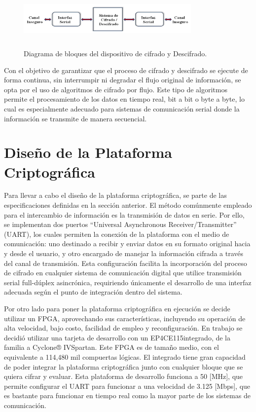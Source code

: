 \clearpage

\begin{figure}[h!] %
    \centering %
     \includegraphics[width=0.8\textwidth, height=3cm]{imagenes/img5} %
    \caption{Diagrama de bloques del dispositivo de cifrado y Descifrado.}
    \label{fig:imagen5} %
\end{figure} 

Con el objetivo de garantizar que el proceso de cifrado y descifrado se ejecute de forma continua, sin interrumpir ni degradar el flujo original de información, se opta por el uso de algoritmos de cifrado por flujo. Este tipo de algoritmos permite el procesamiento de los datos en tiempo real, bit a bit o byte a byte, lo cual es especialmente adecuado para sistemas de comunicación serial donde la información se transmite de manera secuencial.

\section{Diseño de la Plataforma Criptográfica}

Para llevar a cabo el diseño de la plataforma criptográfica, se parte de las especificaciones definidas en la sección anterior. El método comúnmente empleado para el intercambio de información es la transmisión de datos en serie. Por ello, se implementan dos puertos “Universal Asynchronous Receiver/Transmitter” (UART), los cuales permiten la conexión de la plataforma con el medio de comunicación: uno destinado a recibir y enviar datos en su formato original hacia y desde el usuario, y otro encargado de manejar la información cifrada a través del canal de transmisión. Esta configuración facilita la incorporación del proceso de cifrado en cualquier sistema de comunicación digital que utilice transmisión serial full-dúplex asincrónica, requiriendo únicamente el desarrollo de una interfaz adecuada según el punto de integración dentro del sistema.

Por otro lado para poner la plataforma criptográfica en ejecución se decide utilizar un FPGA, aprovechando sus características, incluyendo su operación de alta velocidad, bajo costo, facilidad de empleo y reconfiguración. En trabajo se decidió utilizar una tarjeta de desarrollo con un EP4CE115integrado, de la familia a Cyclone® IVSpartan. Este FPGA es de tamaño medio, con el equivalente a 114,480 mil compuertas lógicas. El integrado tiene gran capacidad de poder integrar la plataforma criptográfica junto con cualquier bloque que se quiera cifrar y evaluar. Esta plataforma de desarrollo funciona a 50 [MHz], que permite configurar el UART para funcionar a una velocidad de 3.125 [Mbps], que es bastante para funcionar en tiempo real como la mayor parte de los sistemas de comunicación.

